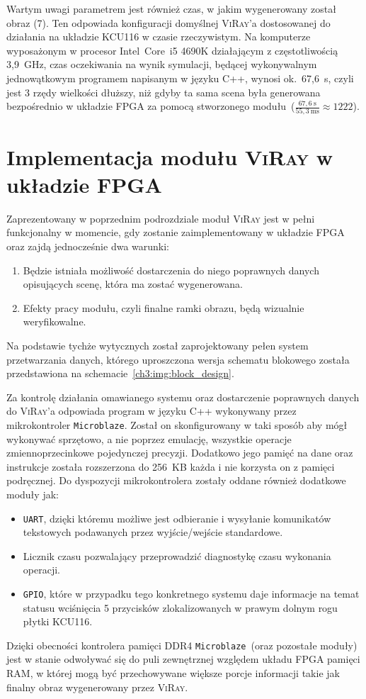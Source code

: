Wartym uwagi parametrem jest również czas, w jakim wygenerowany został obraz (7). Ten odpowiada konfiguracji domyślnej \textsc{ViRay}'a dostosowanej do działania na układzie KCU116 w czasie rzeczywistym. Na komputerze wyposażonym w procesor Intel~Core~i5 4690K działającym z częstotliwością 3,9~GHz, czas oczekiwania na wynik symulacji, będącej wykonywalnym jednowątkowym programem napisanym w języku C++, wynosi ok.~67,6~s, czyli jest 3 rzędy wielkości dłuższy, niż gdyby ta sama scena była generowana bezpośrednio w układzie FPGA za pomocą stworzonego modułu~($\frac{67,6~\mathrm{s}}{55,3~\mathrm{ms}}\approx 1222$). 







\section{Implementacja modułu \textsc{ViRay} w układzie FPGA}
Zaprezentowany w poprzednim podrozdziale moduł \textsc{ViRay} jest w pełni funkcjonalny w momencie, gdy zostanie zaimplementowany w układzie FPGA oraz zajdą jednocześnie dwa warunki:
\begin{enumerate}
\item Będzie istniała możliwość dostarczenia do niego poprawnych danych opisujących scenę, która ma zostać wygenerowana.
\item Efekty pracy modułu, czyli finalne ramki obrazu, będą wizualnie weryfikowalne.
\end{enumerate}
Na podstawie tychże wytycznych został zaprojektowany pełen system przetwarzania danych, którego uproszczona wersja schematu blokowego została przedstawiona na schemacie~\ref{ch3:img:block_design}.

Za kontrolę działania omawianego systemu oraz dostarczenie poprawnych danych do \textsc{ViRay}'a odpowiada program w języku C++ wykonywany przez mikrokontroler \texttt{Microblaze}. Został on skonfigurowany w taki sposób aby mógł wykonywać sprzętowo, a nie poprzez emulację, wszystkie operacje zmiennoprzecinkowe pojedynczej precyzji. Dodatkowo jego pamięć na dane oraz instrukcje została rozszerzona do 256~KB każda i nie korzysta on z pamięci podręcznej. Do dyspozycji mikrokontrolera zostały oddane również dodatkowe moduły jak:
\begin{itemize}
\item \texttt{UART}, dzięki któremu możliwe jest odbieranie i wysyłanie komunikatów tekstowych podawanych przez wyjście/wejście standardowe.
\item Licznik czasu pozwalający przeprowadzić diagnostykę czasu wykonania operacji.
\item \texttt{GPIO}, które w przypadku tego konkretnego systemu daje informacje na temat statusu wciśnięcia 5 przycisków zlokalizowanych w prawym dolnym rogu płytki KCU116.
\end{itemize}
Dzięki obecności kontrolera pamięci DDR4 \texttt{Microblaze}~(oraz pozostałe moduły) jest w stanie odwoływać się do puli zewnętrznej względem układu FPGA pamięci RAM, w której mogą być przechowywane większe porcje informacji takie jak finalny obraz wygenerowany przez \textsc{ViRay}.

